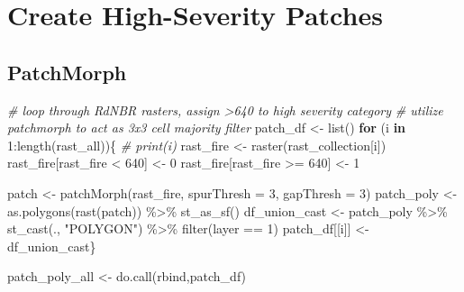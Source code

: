\documentclass[
]{book}
\newenvironment{Shaded}{\begin{snugshade}}{\end{snugshade}}
\newcommand{\AttributeTok}[1]{\textcolor[rgb]{0.77,0.63,0.00}{#1}}
\newcommand{\CommentTok}[1]{\textcolor[rgb]{0.56,0.35,0.01}{\textit{#1}}}
\newcommand{\ControlFlowTok}[1]{\textcolor[rgb]{0.13,0.29,0.53}{\textbf{#1}}}
\newcommand{\DecValTok}[1]{\textcolor[rgb]{0.00,0.00,0.81}{#1}}
\newcommand{\FunctionTok}[1]{\textcolor[rgb]{0.00,0.00,0.00}{#1}}
\newcommand{\NormalTok}[1]{#1}
\newcommand{\OtherTok}[1]{\textcolor[rgb]{0.56,0.35,0.01}{#1}}
\newcommand{\SpecialCharTok}[1]{\textcolor[rgb]{0.00,0.00,0.00}{#1}}
\newcommand{\StringTok}[1]{\textcolor[rgb]{0.31,0.60,0.02}{#1}}
\begin{document}
\hypertarget{create-high-severity-patches}{%
\section{Create High-Severity Patches}\label{create-high-severity-patches}}

\hypertarget{patchmorph}{%
\subsection{PatchMorph}\label{patchmorph}}

\begin{Shaded}
\begin{Highlighting}[]
\CommentTok{\# loop through RdNBR rasters, assign \textgreater{}640 to high severity category}
\CommentTok{\# utilize patchmorph to act as 3x3 cell majority filter}
\NormalTok{patch\_df }\OtherTok{\textless{}{-}} \FunctionTok{list}\NormalTok{()}
\ControlFlowTok{for}\NormalTok{ (i }\ControlFlowTok{in} \DecValTok{1}\SpecialCharTok{:}\FunctionTok{length}\NormalTok{(rast\_all))\{}
  \CommentTok{\# print(i)}
\NormalTok{  rast\_fire }\OtherTok{\textless{}{-}} \FunctionTok{raster}\NormalTok{(rast\_collection[i])}
\NormalTok{  rast\_fire[rast\_fire }\SpecialCharTok{\textless{}} \DecValTok{640}\NormalTok{] }\OtherTok{\textless{}{-}} \DecValTok{0}
\NormalTok{  rast\_fire[rast\_fire }\SpecialCharTok{\textgreater{}=} \DecValTok{640}\NormalTok{] }\OtherTok{\textless{}{-}} \DecValTok{1}

\NormalTok{  patch }\OtherTok{\textless{}{-}} \FunctionTok{patchMorph}\NormalTok{(rast\_fire, }\AttributeTok{spurThresh =} \DecValTok{3}\NormalTok{, }\AttributeTok{gapThresh =} \DecValTok{3}\NormalTok{)}
\NormalTok{  patch\_poly }\OtherTok{\textless{}{-}} \FunctionTok{as.polygons}\NormalTok{(}\FunctionTok{rast}\NormalTok{(patch)) }\SpecialCharTok{\%\textgreater{}\%}
    \FunctionTok{st\_as\_sf}\NormalTok{()}
\NormalTok{  df\_union\_cast }\OtherTok{\textless{}{-}}\NormalTok{ patch\_poly }\SpecialCharTok{\%\textgreater{}\%}
    \FunctionTok{st\_cast}\NormalTok{(., }\StringTok{"POLYGON"}\NormalTok{) }\SpecialCharTok{\%\textgreater{}\%}
    \FunctionTok{filter}\NormalTok{(layer }\SpecialCharTok{==} \DecValTok{1}\NormalTok{)}
\NormalTok{  patch\_df[[i]] }\OtherTok{\textless{}{-}}\NormalTok{ df\_union\_cast\}}

\NormalTok{patch\_poly\_all }\OtherTok{\textless{}{-}} \FunctionTok{do.call}\NormalTok{(rbind,patch\_df)}
\end{Highlighting}
\end{Shaded}
\end{document}
